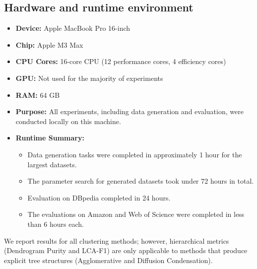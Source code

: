 \subsection{Hardware and runtime environment}
\begin{itemize}
  \item \textbf{Device:} Apple MacBook Pro 16-inch
  \item \textbf{Chip:} Apple M3 Max
  \item \textbf{CPU Cores:} 16-core CPU (12 performance cores, 4 efficiency cores)
  \item \textbf{GPU:} Not used for the majority of experiments
  \item \textbf{RAM:} 64 GB
  \item \textbf{Purpose:} All experiments, including data generation and evaluation, were conducted locally on this machine.
  \item \textbf{Runtime Summary:}
  \begin{itemize}
    \item Data generation tasks were completed in approximately 1 hour for the largest datasets.
    \item The parameter search for generated datasets took under 72 hours in total.
    \item Evaluation on DBpedia completed in 24 hours.
    \item The evaluations on Amazon and Web of Science were completed in less than 6 hours each.
  \end{itemize}

\end{itemize}

We report results for all clustering methods; however, hierarchical metrics 
(Dendrogram Purity and LCA-F1) are only applicable to methods that produce 
explicit tree structures (Agglomerative and Diffusion Condensation).
\FloatBarrier
